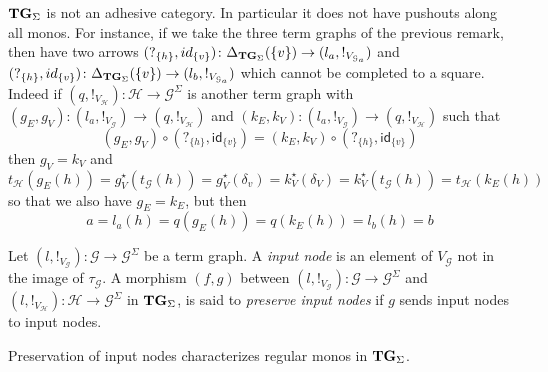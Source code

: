 \documentclass[a4paper,UKenglish,cleveref,pdftex,thm-restate,numberwithinsect]{lipics-v2021}
\newcommand{\catname}[1]{\textbf{\textup{#1}}}
\newcommand{\tg}[0]{\catname{TG}_{\Sigma}}
\newcommand{\commentato}[1]{ {} }
\newcommand{\id}[1]{\mathsf{id}_{#1}}
\begin{document}
{\begin{remark}
	$\tg$ is not an adhesive category. In particular it does not have pushouts along all monos. For instance, if we take the three term graphs of the previous remark, then have two arrows
	$(?_{\{h\}}, \id{\{v\}})\colon \Delta_{\tg}(\{v\})\to (l_a, !_{V_{\mathcal{G}_a}})$ and $(?_{\{h\}}, \id{\{v\}})\colon \Delta_{\tg}(\{v\})\to (l_b, !_{V_{\mathcal{G}_a}})$ which cannot be completed to a square. Indeed if $(q, !_{V_\mathcal{H}})\colon \mathcal{H}\to \mathcal{G}^\Sigma$ is another term graph with $(g_E, g_V)\colon (l_a, !_{V_{\mathcal{G}}})\to (q, !_{V_\mathcal{H}})$ and $(k_E, k_V)\colon (l_a, !_{V_{\mathcal{G}}})\to (q, !_{V_\mathcal{H}})$  such that 
	\[(g_E, g_V)\circ (?_{\{h\}}, \id{\{v\}}) = (k_E, k_V)\circ (?_{\{h\}}, \id{\{v\}})\]
	then $g_V=k_V$ and
	\[t_{\mathcal{H}}(g_E(h))=g^\star_V(t_{\mathcal{G}}(h))=g_V^\star(\delta_v)=k^\star_V(\delta_V)=k^\star_V(t_{\mathcal{G}}(h))=t_{\mathcal{H}}(k_E(h))\]
	so that we also have $g_E=k_E$, but then
	\[
	a=l_a(h)=q(g_E(h))=q(k_E(h))=l_b(h)=b\]
\end{remark}
}

\begin{definition}
	Let $(l, !_{V_{\mathcal{G}}})\colon \mathcal{G}\to \mathcal{G}^{\Sigma}$  be a term graph. A \emph{input node} is an element of $V_{\mathcal{G}}$ not in the image of $\tau_{\mathcal{G}}$.  A morphism $(f,g)$ between
	 $(l, !_{V_{\mathcal{G}}})\colon \mathcal{G}\to \mathcal{G}^{\Sigma}$ and $(l, !_{V_{\mathcal{H}}})\colon \mathcal{H}\to \mathcal{G}^{\Sigma}$ in $\tg$, is said to \emph{preserve input nodes} if $g$ sends input nodes to input nodes.
\end{definition}

\commentato{
\todo{Se questo remark sotto non serve nel pezzo sulle equivalenze possiamo toglierlo}
\begin{remark}\label{prop:image}
	Suppose that $(f,g)\colon (l, !_{V_{\mathcal{G}}})\to (l', !_{V_{\mathcal{H}}})$ preserves input nodes. Then  if $\tau_{\mathcal{H}}(h)=g(v)$ for some $v\in V_{\mathcal{G}}$ then $h$ belongs to the image of $f$. Indeed, by hypothesis $v$ must be in the image of $\tau_{\mathcal{G}}$ and so there exists $k$ such that $\tau_{\mathcal{G}}(k)=v$. But then $\tau_{\mathcal{H}}(f(k))=g(v)$ and we can conclude that $f(k)=h$.
\end{remark}
}

Preservation of input nodes characterizes regular monos in $\tg$.

\end{document}
